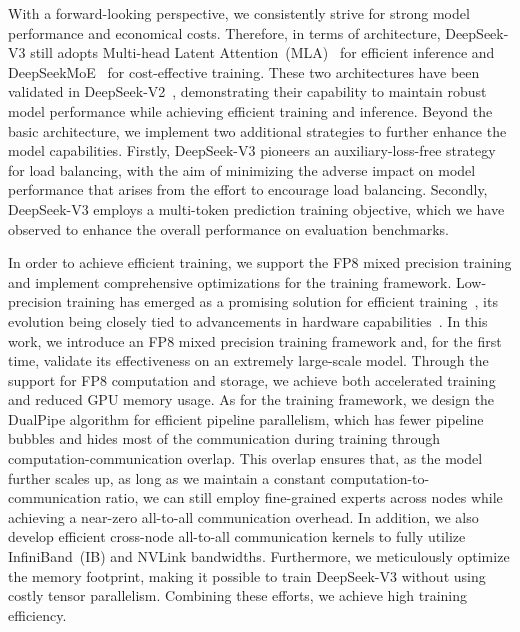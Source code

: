 \documentclass[11pt, a4paper, logo, copyright, nonumbering]{deepseek}
\newcommand{\dsvii}{DeepSeek-V2}
\newcommand{\dsattn}{MLA}
\newcommand{\dsmoe}{DeepSeekMoE}
\newcommand{\dsviii}{DeepSeek-V3}
\begin{document}
\begin{CJK*}{UTF8}{gbsn}
With a forward-looking perspective, we consistently strive for strong model performance and economical costs.
Therefore, in terms of architecture, \dsviii{} still adopts Multi-head Latent Attention~(\dsattn{})~\citep{dsvii} for efficient inference and \dsmoe{}~\citep{deepseekmoe} for cost-effective training. 
These two architectures have been validated in \dsvii{}~\citep{dsvii}, demonstrating their capability to maintain robust model performance while achieving efficient training and inference.
Beyond the basic architecture, we implement two additional strategies to further enhance the model capabilities. 
Firstly, \dsviii{} pioneers an auxiliary-loss-free strategy~\citep{noaux_tc} for load balancing, with the aim of minimizing the adverse impact on model performance that arises from the effort to encourage load balancing.
Secondly, \dsviii{} employs a multi-token prediction training objective, which we have observed to enhance the overall performance on evaluation benchmarks.

In order to achieve efficient training, we support the FP8 mixed precision training and implement comprehensive optimizations for the training framework.
Low-precision training has emerged as a promising solution for efficient training~\citep{bf16train, fp16train, fp8lm, llm.int8}, its evolution being closely tied to advancements in hardware capabilities~\citep{fp8format, hifp8format, microscaling}. 
In this work, we introduce an FP8 mixed precision training framework and, for the first time, validate its effectiveness on an extremely large-scale model. 
Through the support for FP8 computation and storage, we achieve both accelerated training and reduced GPU memory usage. 
As for the training framework, we design the DualPipe algorithm for efficient pipeline parallelism, which has fewer pipeline bubbles and hides most of the communication during training through computation-communication overlap.
This overlap ensures that, as the model further scales up, as long as we maintain a constant computation-to-communication ratio, we can still employ fine-grained experts across nodes while achieving a near-zero all-to-all communication overhead.
In addition, we also develop efficient cross-node all-to-all communication kernels to fully utilize InfiniBand~(IB) and NVLink bandwidths. 
Furthermore, we meticulously optimize the memory footprint, making it possible to train \dsviii{} without using costly tensor parallelism.
Combining these efforts, we achieve high training efficiency. 


\end{CJK*}
\end{document}
